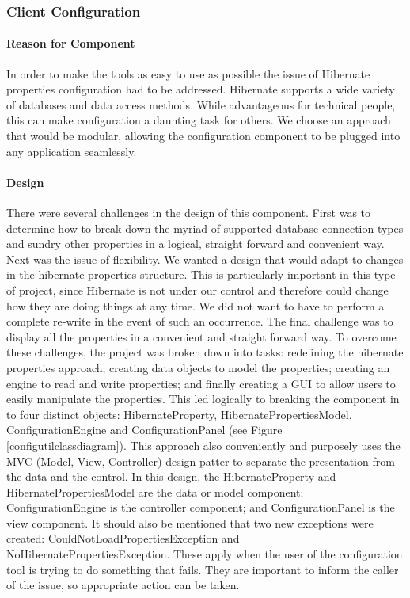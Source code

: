 \subsubsection{Client Configuration}

\paragraph{Reason for Component}
In order to make the tools as easy to use as possible the issue of Hibernate properties configuration had to be addressed. Hibernate supports a wide variety of databases and data access methods. While advantageous for technical people, this can make configuration a daunting task for others. We choose an approach that would be modular, allowing the configuration component to be plugged into any application seamlessly.  


\paragraph{Design}
There were several challenges in the design of this component. First was to determine how to break down the myriad of supported database connection types and sundry other properties in a logical, straight forward and convenient way. Next was the issue of flexibility. We wanted a design that would adapt to changes in the hibernate properties structure. This is particularly important in this type of project, since Hibernate is not under our control and therefore could change how they are doing things at any time. We did not want to have to perform a complete re-write in the event of such an occurrence. The final challenge was to display all the properties in a convenient and straight forward way. To overcome these challenges, the project was broken down into tasks: redefining the hibernate properties approach; creating data objects to model the properties; creating an engine to read and write properties; and finally creating a GUI to allow users to easily manipulate the properties. This led logically to breaking the component in to four distinct objects: HibernateProperty, HibernatePropertiesModel, ConfigurationEngine and ConfigurationPanel 
(see Figure \ref{configutilclassdiagram}). This approach also conveniently and purposely uses the MVC (Model, View, Controller) design patter to separate the presentation from the data and the control. In this design, the HibernateProperty and HibernatePropertiesModel are the data or model component; ConfigurationEngine is the controller component; and ConfigurationPanel is the view component. It should also be mentioned that two new exceptions were created: CouldNotLoadPropertiesException and NoHibernatePropertiesException. These apply when the user of the configuration tool is trying to do something that fails. They are important to inform the caller of the issue, so appropriate action can be taken.

